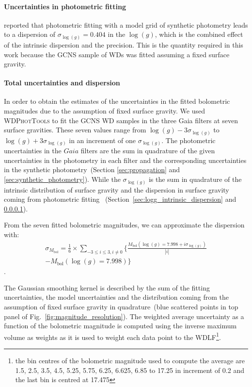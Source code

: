 \documentclass[fleqn,usenatbib]{mnras}
\begin{document}
\paragraph{Uncertainties in photometric fitting \hfill\\}
\label{sec:logg_photometric_fitting}
\citet{2014ApJ...796..128G} reported that photometric fitting with a model
grid of synthetic photometry leads to a dispersion of
$\sigma_{\log(g)} = 0.404$ in the $\log(g)$, which is the combined
effect of the intrinsic dispersion and the precision. This is the quantity
required in this work because the GCNS sample of WDs was fitted assuming
a fixed surface gravity.

\paragraph*{Total uncertainties and dispersion \hfill\\}
In order to obtain the estimates of the uncertainties in the fitted bolometric
magnitudes due to the assumption of fixed surface gravity. We used
\textsc{WDPhotTools} to fit the GCNS WD samples in the three Gaia filters at
seven surface gravities. These seven values range from
$\log(g) - 3\sigma_{\log(g)}$ to $\log(g) + 3\sigma_{\log(g)}$
in an increment of one $\sigma_{\log(g)}$. The photometric
uncertainties in the $Gaia$ filters are the sum in quadrature of the given
uncertainties in the photometry in each filter and the corresponding
uncertainties in the synthetic photometry~(Section \ref{sec:propagation} and
\ref{sec:synthetic_photometry}). While the $\sigma_{\log(g)}$ is the
sum in quadrature of the intrinsic distribution of surface gravity and the
dispersion in surface gravity coming from photometric fitting~
(Section~\ref{sec:logg_intrinsic_dispersion} and \ref{sec:logg_photometric_fitting}).

From the seven fitted
bolometric magnitudes, we can approximate the dispersion with:
\begin{multline}
  \sigma_{M_{\mathrm{bol}}} = \frac{1}{6} \times \sum_{-3 \leq i \leq 3, i \neq 0} \Biggl\{ \frac{M_{\mathrm{bol}}(\log(g)=7.998 + i\sigma_{\log(g)})}{|i|} \\
  - M_{\mathrm{bol}}(\log(g)=7.998) \Biggr\}
\end{multline}
.

The Gaussian smoothing kernel is described by the sum of the fitting
uncertainties, the model uncertainties and the distribution coming from the
assumption of fixed surface gravity in quadrature~(blue scattered points in top
panel of Fig.~\ref{fig:magnitude_resolution}). The weighted average uncertainty
as a function of the bolometric magnitude is computed using the inverse maximum
volume as weights as it is used to weight each data point to the WDLF\footnote{
the bin centres of the bolometric magnitude used to compute the average are
1.5,  2.5,  3.5,  4.5,  5.25,  5.75,  6.25,  6.625, 6.85 to 17.25 in increment
of 0.2 and the last bin is centred at 17.475}.
\end{document}
